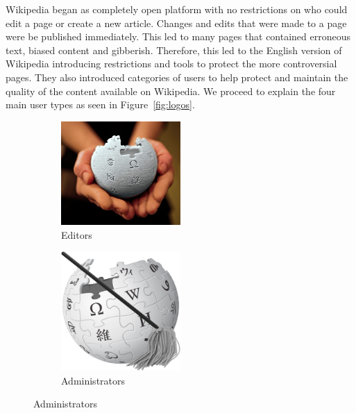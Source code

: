 Wikipedia began as completely open platform with no restrictions on who could edit a page or create a new article. Changes and edits that were made to a page were be published immediately. This led to many pages that contained erroneous text, biased content and gibberish. Therefore, this led to the English version of Wikipedia introducing restrictions and tools to protect the more controversial pages. They also introduced categories of users to help protect and maintain the quality of the content available on Wikipedia. We proceed to explain the four main user types as seen in Figure~\ref{fig:logos}. 
\begin{figure}[h!]
    \centering
    \begin{subfigure}[b]{0.49\textwidth}
        \centering
        \includegraphics[width=0.5\textwidth]{images/wikipedians.jpg}
        \caption{Editors}
        \label{fig:editors}
    \end{subfigure}
    \begin{subfigure}[b]{0.49\textwidth}
        \centering
        \includegraphics[width=0.5\textwidth]{images/admins.png}
        \caption{Administrators}
        \label{fig:admins}
    \end{subfigure}


\end{figure}
